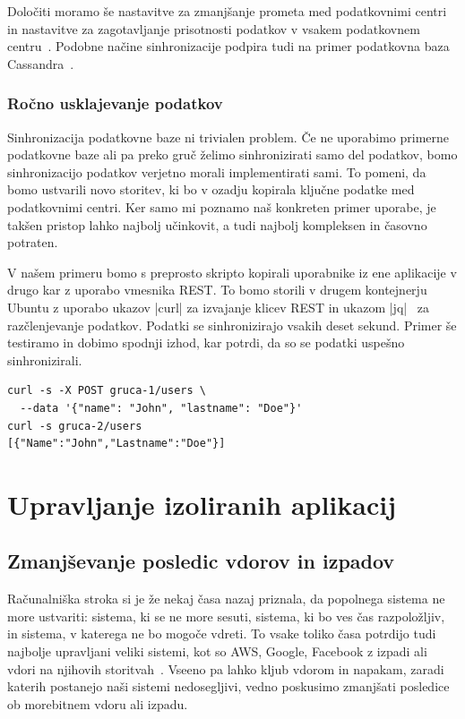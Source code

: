 \documentclass[a4paper, 12pt]{book}
\begin{document}
Določiti moramo še nastavitve za zmanjšanje prometa med podatkovnimi centri in nastavitve za zagotavljanje prisotnosti podatkov v vsakem podatkovnem centru~\cite{cratedb-zone}.
Podobne načine sinhronizacije podpira tudi na primer podatkovna baza Cassandra~\cite{cassandra-zone}.
\subsection{Ročno usklajevanje podatkov}
Sinhronizacija podatkovne baze ni trivialen problem.
Če ne uporabimo primerne podatkovne baze ali pa preko gruč želimo sinhronizirati samo del podatkov, bomo sinhronizacijo podatkov verjetno morali implementirati sami.
To pomeni, da bomo ustvarili novo storitev, ki bo v ozadju kopirala ključne podatke med podatkovnimi centri.
Ker samo mi poznamo naš konkreten primer uporabe, je takšen pristop lahko najbolj učinkovit, a tudi najbolj kompleksen in časovno potraten.

V našem primeru bomo s preprosto skripto kopirali uporabnike iz ene aplikacije v drugo kar z uporabo vmesnika REST.
To bomo storili v drugem kontejnerju Ubuntu z uporabo ukazov \spverb|curl| za izvajanje klicev REST in ukazom \spverb|jq|~\cite{jq} za razčlenjevanje podatkov.
Podatki se sinhronizirajo vsakih deset sekund.
Primer še testiramo in dobimo spodnji izhod, kar potrdi, da so se podatki uspešno sinhronizirali.
\begin{verbatim}
curl -s -X POST gruca-1/users \
  --data '{"name": "John", "lastname": "Doe"}'
curl -s gruca-2/users
[{"Name":"John","Lastname":"Doe"}]
\end{verbatim}
\chapter{Upravljanje izoliranih aplikacij}
\section{Zmanjševanje posledic vdorov in izpadov}
Računalniška stroka si je že nekaj časa nazaj priznala, da popolnega sistema ne more ustvariti: sistema, ki se ne more sesuti, sistema, ki bo ves čas razpoložljiv, in sistema, v katerega ne bo mogoče vdreti.
To vsake toliko časa potrdijo tudi najbolje upravljani veliki sistemi, kot so AWS, Google, Facebook z izpadi ali vdori na njihovih storitvah~\cite{common-outages}. 
Vseeno pa lahko kljub vdorom in napakam, zaradi katerih postanejo naši sistemi nedosegljivi, vedno poskusimo zmanjšati posledice ob morebitnem vdoru ali izpadu. 
\end{document}
